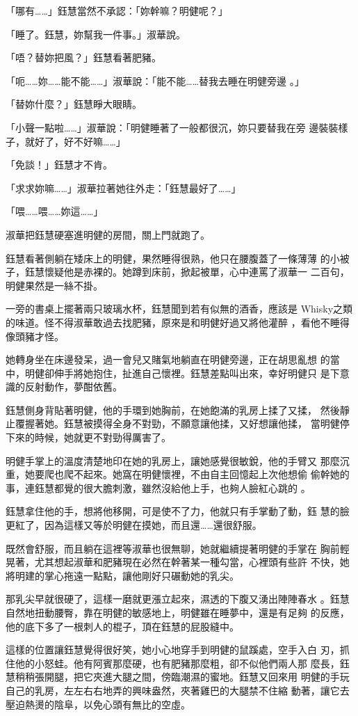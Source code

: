 「哪有……」鈺慧當然不承認：「妳幹嘛？明健呢？」

「睡了。鈺慧，妳幫我一件事。」淑華說。

「唔？替妳把風？」鈺慧看著肥豬。

「呃……妳……能不能……」淑華說：「能不能……替我去睡在明健旁邊
。」

「替妳什麼？」鈺慧睜大眼睛。

「小聲一點啦……」淑華說：「明健睡著了一般都很沉，妳只要替我在旁
邊裝裝樣子，就好了，好不好嘛……」

「免談！」鈺慧才不肯。

「求求妳嘛……」淑華拉著她往外走：「鈺慧最好了……」

「喂……喂……妳這……」

淑華把鈺慧硬塞進明健的房間，關上門就跑了。

鈺慧看著側躺在矮床上的明健，果然睡得很熟，他只在腰腹蓋了一條薄薄
的小被子，鈺慧懷疑他是赤裸的。她蹲到床前，掀起被單，心中連罵了淑華一
二百句，明健果然是一絲不掛。

一旁的書桌上擺著兩只玻璃水杯，鈺慧聞到若有似無的酒香，應該是
Whisky之類的味道。怪不得淑華敢過去找肥豬，原來是和明健好過又將他灌醉
，看他不睡得像頭豬才怪。

她轉身坐在床邊發呆，過一會兒又賭氣地躺直在明健旁邊，正在胡思亂想
的當中，明健卻伸手將她抱住，扯進自己懷裡。鈺慧差點叫出來，幸好明健只
是下意識的反射動作，夢酣依舊。

鈺慧側身背貼著明健，他的手環到她胸前，在她飽滿的乳房上揉了又揉，
然後靜止覆握著她。鈺慧被摸得全身不對勁，不願意讓他揉，又好想讓他揉，
當明健停下來的時候，她就更不對勁得厲害了。

明健手掌上的溫度清楚地印在她的乳房上，讓她感覺很敏銳，他的手臂又
那麼沉重，她要爬也爬不起來。她窩在明健懷裡，不由自主回憶起上次他想偷
偷幹她的事，連鈺慧都覺的很大膽刺激，雖然沒給他上手，也夠人臉紅心跳的
。

鈺慧拿住他的手，想將他移開，可是使不了力，他就只有手掌動了動，鈺
慧的臉更紅了，因為這樣又等於明健在摸她，而且還……還很舒服。

既然會舒服，而且躺在這裡等淑華也很無聊，她就繼續提著明健的手掌在
胸前輕晃著，尤其想起淑華和肥豬現在必然在幹著某一種勾當，心裡頭有些許
不快，她將明建的掌心拖遠一點點，讓他剛好只碾動她的乳尖。

那乳尖早就很硬了，這樣一磨就更漲立起來，濕透的下腹又湧出陣陣春水
。鈺慧自然地扭動腰臀，靠在明健的敏感地上，明健雖在睡夢中，還是有足夠
的反應，他的底下多了一根刺人的棍子，頂在鈺慧的屁股縫中。

這樣的位置讓鈺慧覺得很好笑，她小心地穿手到明健的鼠蹊處，空手入白
刃，抓住他的小怒蛙。他有阿賓那麼硬，也有肥豬那麼粗，卻不似他們兩人那
麼長，鈺慧稍稍張開腿，把它夾進大腿之間，傍臨潮濕的蜜地。鈺慧又回來用
明健的手玩自己的乳房，左左右右地弄的興味盎然，夾著雞巴的大腿禁不住縮
動著，讓它去壓迫熱燙的陰阜，以免心頭有無比的空虛。

